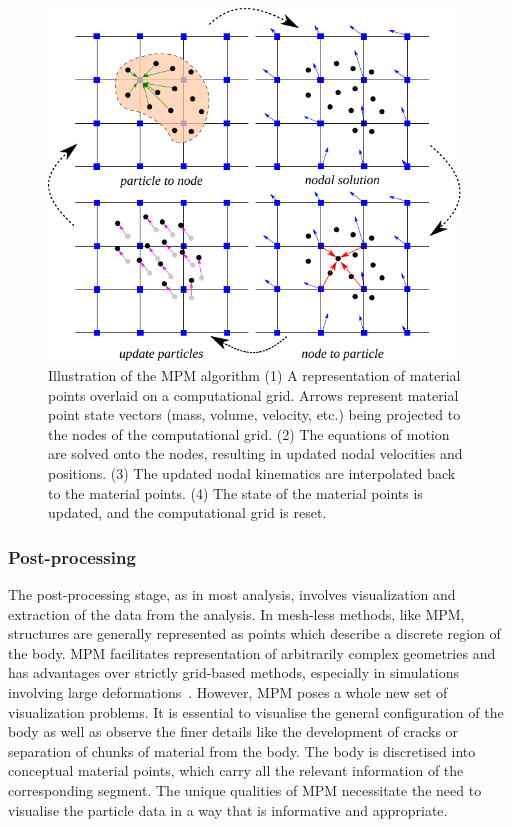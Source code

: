 \begin{figure}[htbp]
\centering
\includegraphics[width=0.975\textwidth]{MPMsteps}
\caption[Illustration of the MPM algorithm.]{Illustration of the MPM algorithm (1) A 
representation of material points overlaid on a computational grid. Arrows 
represent material point state vectors (mass, volume, velocity, etc.) being 
projected to the nodes of the computational grid. (2) The equations of motion 
are solved onto the nodes, resulting in updated nodal velocities and positions. 
(3) The updated nodal kinematics are interpolated back to the material points. 
(4)  The state of the material points is updated, and the computational grid is 
reset.} 
\label{fig:MPMsteps}
\end{figure}

\subsubsection{Post-processing}

The post-processing stage, as in most analysis, involves visualization 
and extraction of the data from the analysis. In mesh-less methods, like MPM, 
structures are generally represented as points which 
describe a discrete region of the body. MPM facilitates representation of 
arbitrarily complex geometries and has advantages over strictly grid-based 
methods, especially in simulations involving large 
deformations~\citep{Bardenhagen2000}. However, MPM poses a whole new set of 
visualization problems. It is essential to visualise the general configuration 
of the body as well as observe the finer details like the development of cracks 
or separation of chunks of material from the body. The body is discretised into 
conceptual material points, which carry all the relevant information of the 
corresponding segment. The unique qualities of MPM necessitate the need to 
visualise the particle data in a way that is informative and appropriate.

